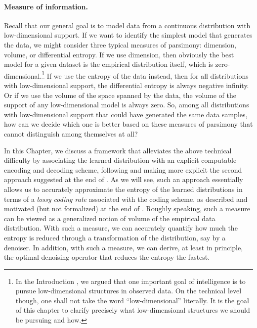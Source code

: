 \documentclass[../../book-main.tex]{subfiles}
\begin{document}
\paragraph{Measure of information.}
Recall that our general goal is to model data from a continuous
distribution with low-dimensional support. If we want to identify the
simplest model that generates the data, we might consider three
typical measures of parsimony: dimension, volume, or differential
entropy. If we use dimension, then obviously the best model for a
given dataset is the empirical distribution itself, which is
zero-dimensional.\footnote{In the Introduction
    , we argued that one important goal of intelligence is
    to pursue low-dimensional structures in observed data. On the
    technical level though, one shall not take the word
    ``low-dimensional'' literally. It is the goal of this chapter to
    clarify precisely what low-dimensional structures we should be
pursuing and how.} If we use the entropy of the data instead, then
for all distributions with low-dimensional support, the differential
entropy is always negative infinity. Or if we use the volume of the
space spanned by the data, the volume of the support of any
low-dimensional model is always zero. So, among all distributions with
low-dimensional support that could have generated the same data
samples, how can we decide which one is better based on these
measures of parsimony that cannot distinguish among themselves at all?

In this Chapter, we discuss a framework that alleviates the above
technical difficulty by associating the learned distribution with an
explicit computable encoding and decoding scheme, following and
making more explicit the second approach suggested at the end of
. As we will see, such an approach essentially
allows us to accurately approximate the entropy of the learned
distributions in terms of a \textit{lossy coding rate} associated
with the coding scheme, as described and motivated (but not formalized)
at the end of .
Roughly speaking, such a measure can be viewed as a generalized
notion of volume of the empirical data distribution. With such a
measure, we can accurately quantify how much the entropy is reduced
through a transformation of the distribution, say by a denoiser. In
addition, with such a measure, we can derive, at least in principle,
the optimal denoising operator that reduces the entropy the fastest.
\end{document}
